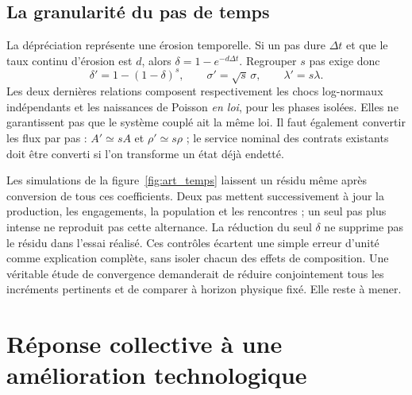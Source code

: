 \subsection{La granularité du pas de temps}\label{sec:temps}
La dépréciation représente une érosion temporelle. Si un pas dure
$\Delta t$ et que le taux continu d'érosion est $d$, alors
$\delta=1-e^{-d\Delta t}$. Regrouper $s$ pas exige donc
\[
 \delta'=1-(1-\delta)^s,\qquad
 \sigma'=\sqrt{s}\,\sigma,\qquad \lambda'=s\lambda.
\]
Les deux dernières relations composent respectivement les chocs log-normaux
indépendants et les naissances de Poisson \emph{en loi}, pour les phases
isolées. Elles ne garantissent pas que le système couplé ait la même loi.
Il faut également convertir les flux par pas : $A'\simeq sA$ et
$\rho'\simeq s\rho$ ; le service nominal des contrats existants doit
être converti si l'on transforme un état déjà endetté.


Les simulations de la figure~\ref{fig:art_temps} laissent un résidu même
après conversion de tous ces coefficients. Deux pas mettent successivement
à jour la production, les engagements, la population et les rencontres ;
un seul pas plus intense ne reproduit pas cette alternance. La réduction
du seul $\delta$ ne supprime pas le résidu dans l'essai réalisé.
Ces contrôles écartent une simple erreur d'unité comme explication complète,
sans isoler chacun des effets de composition. Une véritable étude de
convergence demanderait de réduire conjointement tous les incréments
pertinents et de comparer à horizon physique fixé. Elle reste à mener.

\section{Réponse collective à une amélioration technologique}\label{sec:rebond}
